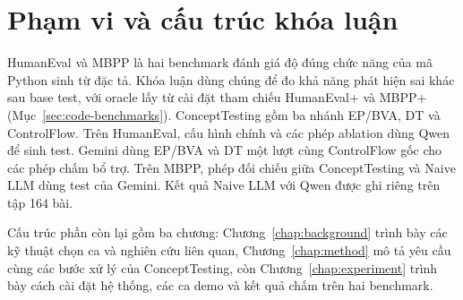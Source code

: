 \section*{Phạm vi và cấu trúc khóa luận}

HumanEval và MBPP là hai benchmark đánh giá độ đúng chức năng của mã Python sinh từ đặc tả. Khóa luận dùng chúng để đo khả năng phát hiện sai khác sau base test, với oracle lấy từ cài đặt tham chiếu HumanEval+ và MBPP+ (Mục~\ref{sec:code-benchmarks}). ConceptTesting gồm ba nhánh EP/BVA, DT và ControlFlow. Trên HumanEval, cấu hình chính và các phép ablation dùng Qwen để sinh test. Gemini dùng EP/BVA và DT một lượt cùng ControlFlow gốc cho các phép chấm bổ trợ. Trên MBPP, phép đối chiếu giữa ConceptTesting và Naive LLM dùng test của Gemini. Kết quả Naive LLM với Qwen được ghi riêng trên tập 164 bài.

Cấu trúc phần còn lại gồm ba chương: Chương~\ref{chap:background} trình bày các kỹ thuật chọn ca và nghiên cứu liên quan, Chương~\ref{chap:method} mô tả yêu cầu cùng các bước xử lý của ConceptTesting, còn Chương~\ref{chap:experiment} trình bày cách cài đặt hệ thống, các ca demo và kết quả chấm trên hai benchmark.
